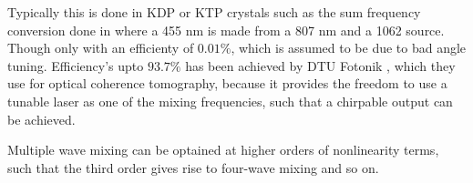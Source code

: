 Typically this is done in KDP or KTP crystals such as the sum frequency conversion
done in \cite{sumFreq} where a 455 nm is made from a 807 nm and a 1062 source. Though only with an efficienty of $0.01\%$, which is assumed to be due to bad angle tuning. Efficiency's upto $93.7\%$ has been achieved by DTU Fotonik \cite{DTU}, which they use for optical coherence tomography, because it provides the freedom to use a tunable laser as one of the mixing frequencies, such that a chirpable output can be achieved.

Multiple wave mixing can be optained at higher orders of nonlinearity terms, such
that the third order gives rise to four-wave mixing and so on.




